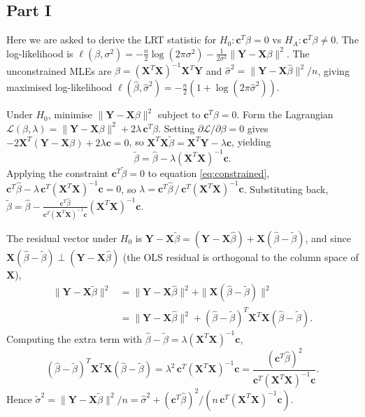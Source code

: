 \documentclass[letterpaper]{article}
\begin{document}
		\subsection{Part I}
		
		 {Here we are asked to derive the LRT statistic for $H_0: \mathbf{c}^T\beta = 0$ vs $H_A: \mathbf{c}^T\beta \neq 0$.}
			The log-likelihood is $\ell(\beta,\sigma^2) = -\frac{n}{2}\log(2\pi\sigma^2) - \frac{1}{2\sigma^2}\|\mathbf{Y}-\mathbf{X}\beta\|^2$.
			The unconstrained MLEs are $\hat{\beta} = (\mathbf{X}^T\mathbf{X})^{-1}\mathbf{X}^T\mathbf{Y}$ and
			$\hat{\sigma}^2 = \|\mathbf{Y} - \mathbf{X}\hat{\beta}\|^2/n$, giving maximised log-likelihood
			$\ell(\hat{\beta},\hat{\sigma}^2) = -\frac{n}{2}(1 + \log(2\pi\hat{\sigma}^2))$.
			
			Under $H_0$, minimise $\|\mathbf{Y} - \mathbf{X}\beta\|^2$ subject to $\mathbf{c}^T\beta = 0$.
			Form the Lagrangian
			$\mathcal{L}(\beta,\lambda) = \|\mathbf{Y} - \mathbf{X}\beta\|^2 + 2\lambda\,\mathbf{c}^T\beta$.
			Setting $\partial\mathcal{L}/\partial\beta = 0$ gives
			$-2\mathbf{X}^T(\mathbf{Y} - \mathbf{X}\beta) + 2\lambda\mathbf{c} = 0$,
			so $\mathbf{X}^T\mathbf{X}\tilde{\beta} = \mathbf{X}^T\mathbf{Y} - \lambda\mathbf{c}$,
			yielding
			\begin{equation}\label{eq:constrained}
				\tilde{\beta} = \hat{\beta} - \lambda(\mathbf{X}^T\mathbf{X})^{-1}\mathbf{c}.
			\end{equation}
			Applying the constraint $\mathbf{c}^T\tilde{\beta} = 0$ to  equation \eqref{eq:constrained},
			$\mathbf{c}^T\hat{\beta} - \lambda\,\mathbf{c}^T(\mathbf{X}^T\mathbf{X})^{-1}\mathbf{c} = 0$,
			so $\lambda = \mathbf{c}^T\hat{\beta} \,/\, \mathbf{c}^T(\mathbf{X}^T\mathbf{X})^{-1}\mathbf{c}$.
			Substituting back,
			$\tilde{\beta} = \hat{\beta} - \frac{\mathbf{c}^T\hat{\beta}}{\mathbf{c}^T(\mathbf{X}^T\mathbf{X})^{-1}\mathbf{c}}(\mathbf{X}^T\mathbf{X})^{-1}\mathbf{c}$.
			
			The residual vector under $H_0$ is
			$\mathbf{Y} - \mathbf{X}\tilde{\beta} = (\mathbf{Y} - \mathbf{X}\hat{\beta}) + \mathbf{X}(\hat{\beta}-\tilde{\beta})$,
			and since $\mathbf{X}(\hat\beta - \tilde\beta) \perp (\mathbf{Y}-\mathbf{X}\hat\beta)$ (the OLS residual is orthogonal to the column space of $\mathbf{X}$),
			\begin{align*}
				\|\mathbf{Y}-\mathbf{X}\tilde{\beta}\|^2
				&= \|\mathbf{Y}-\mathbf{X}\hat{\beta}\|^2
				+ \|\mathbf{X}(\hat{\beta}-\tilde{\beta})\|^2 \\
				&= \|\mathbf{Y}-\mathbf{X}\hat{\beta}\|^2
				+ (\hat{\beta}-\tilde{\beta})^T\mathbf{X}^T\mathbf{X}(\hat{\beta}-\tilde{\beta}).
			\end{align*}
			Computing the extra term with $\hat\beta - \tilde\beta = \lambda(\mathbf{X}^T\mathbf{X})^{-1}\mathbf{c}$,
			\[
			(\hat{\beta}-\tilde{\beta})^T\mathbf{X}^T\mathbf{X}(\hat{\beta}-\tilde{\beta})
			= \lambda^2\,\mathbf{c}^T(\mathbf{X}^T\mathbf{X})^{-1}\mathbf{c}
			= \frac{(\mathbf{c}^T\hat{\beta})^2}{\mathbf{c}^T(\mathbf{X}^T\mathbf{X})^{-1}\mathbf{c}}.
			\]
			Hence $\tilde{\sigma}^2 = \|\mathbf{Y}-\mathbf{X}\tilde{\beta}\|^2/n = \hat{\sigma}^2 + (\mathbf{c}^T\hat{\beta})^2 / (n\,\mathbf{c}^T(\mathbf{X}^T\mathbf{X})^{-1}\mathbf{c})$.
			
\end{document}
